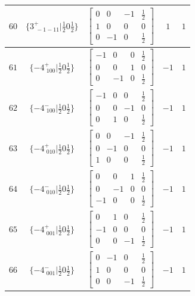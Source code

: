\documentclass[fleqn,8pt]{jsarticle}
\begin{document}
\begin{longtable}{ccccc}
$ 60 $ & $ \{3^{+}_{\,\,-1-11}|\frac{1}{2} 0 \frac{1}{2}\} $ & $ \begin{bmatrix} 0 & 0 & -1 & \frac{1}{2} \\ 1 & 0 & 0 & 0 \\ 0 & -1 & 0 & \frac{1}{2} \end{bmatrix} $ & $ 1 $ & $ 1 $ \\ \hline
$ 61 $ & $ \{-4^{+}_{\,\,100}|\frac{1}{2} 0 \frac{1}{2}\} $ & $ \begin{bmatrix} -1 & 0 & 0 & \frac{1}{2} \\ 0 & 0 & 1 & 0 \\ 0 & -1 & 0 & \frac{1}{2} \end{bmatrix} $ & $ -1 $ & $ 1 $ \\ \hline
$ 62 $ & $ \{-4^{-}_{\,\,100}|\frac{1}{2} 0 \frac{1}{2}\} $ & $ \begin{bmatrix} -1 & 0 & 0 & \frac{1}{2} \\ 0 & 0 & -1 & 0 \\ 0 & 1 & 0 & \frac{1}{2} \end{bmatrix} $ & $ -1 $ & $ 1 $ \\ \hline
$ 63 $ & $ \{-4^{+}_{\,\,010}|\frac{1}{2} 0 \frac{1}{2}\} $ & $ \begin{bmatrix} 0 & 0 & -1 & \frac{1}{2} \\ 0 & -1 & 0 & 0 \\ 1 & 0 & 0 & \frac{1}{2} \end{bmatrix} $ & $ -1 $ & $ 1 $ \\ \hline
$ 64 $ & $ \{-4^{-}_{\,\,010}|\frac{1}{2} 0 \frac{1}{2}\} $ & $ \begin{bmatrix} 0 & 0 & 1 & \frac{1}{2} \\ 0 & -1 & 0 & 0 \\ -1 & 0 & 0 & \frac{1}{2} \end{bmatrix} $ & $ -1 $ & $ 1 $ \\ \hline
$ 65 $ & $ \{-4^{+}_{\,\,001}|\frac{1}{2} 0 \frac{1}{2}\} $ & $ \begin{bmatrix} 0 & 1 & 0 & \frac{1}{2} \\ -1 & 0 & 0 & 0 \\ 0 & 0 & -1 & \frac{1}{2} \end{bmatrix} $ & $ -1 $ & $ 1 $ \\ \hline
$ 66 $ & $ \{-4^{-}_{\,\,001}|\frac{1}{2} 0 \frac{1}{2}\} $ & $ \begin{bmatrix} 0 & -1 & 0 & \frac{1}{2} \\ 1 & 0 & 0 & 0 \\ 0 & 0 & -1 & \frac{1}{2} \end{bmatrix} $ & $ -1 $ & $ 1 $ \\ \hline

\end{longtable}
\end{document}
